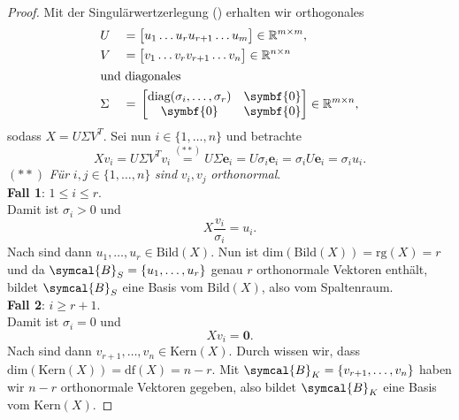 \begin{proof}
    Mit der Singulärwertzerlegung () erhalten wir orthogonales
    \begin{alignat*}{2}
        &U &{}={}&
        \big[
        \begin{matrix}
            u_1 \dots u_{r}u_{r+1} \dots u_m
        \end{matrix}
        \big]
        \in \R^{m \times m}, \\
        &V &{}={}&
        \big[
        \begin{matrix}
            v_1 \dots v_{r}v_{r+1} \dots v_n
        \end{matrix}
        \big]
        \in \R^{n \times n} \\
        \intertext{und diagonales} 
        &\Sigma &{}={}&
        \begin{bmatrix}
            \text{diag}(\sigma_i,\ldots,\sigma_r) & \symbf{0} \\
            \symbf{0} & \symbf{0}
        \end{bmatrix}
        \in \R^{m \times n},
    \end{alignat*} 
    sodass
    \(
        X = U \Sigma V^{T}
    \).
    Sei nun \(i \in \{1,\ldots,n\}\) und betrachte 
    \begin{equation*}
        Xv_i = U \Sigma V^{T}v_i \overset{(**)}{=} U \Sigma \symbf{e}_i = U \sigma_i \symbf{e}_i = \sigma_i U \symbf{e}_i = \sigma_i u_i.
    \end{equation*}
    {\small\((**)\) \textit{Für} \(i, j \in \{1,\ldots,n\}\) \textit{sind} \(v_i, v_j\) \textit{orthonormal}.} 
    \vspace{5pt}
    \\
    \textbf{Fall 1}: \(1 \leq i \leq r\). \\
    Damit ist \(\sigma_i > 0\) und
    \begin{equation*}
        X \frac{v_i}{\sigma_i} = u_i.
    \end{equation*} 
    Nach  sind dann \(u_1,\ldots,u_r \in \text{Bild}(X)\).
    Nun ist \(\text{dim}(\text{Bild}(X)) = \text{rg}(X) = r\) und da \(\symcal{B}_S = \{u_1,\ldots,u_r\}\) genau \(r\) orthonormale Vektoren enthält, bildet \(\symcal{B}_S\) eine Basis vom \(\text{Bild}(X)\), also vom Spaltenraum. 
    \vspace{5pt} \\
    \textbf{Fall 2}: \(i \geq r+1\). \\
    Damit ist \(\sigma_i = 0\) und
    \begin{equation*}
        Xv_i = \symbf{0}.
    \end{equation*}  
    Nach  sind dann \(v_{r+1},\ldots,v_n \in \text{Kern}(X)\).
    Durch  wissen wir, dass \(\text{dim}(\text{Kern}(X)) = \text{df}(X) = n - r\). 
    Mit \(\symcal{B}_K = \{v_{r+1},\ldots,v_n\}\) haben wir \(n-r\) orthonormale Vektoren gegeben, also bildet \(\symcal{B}_K\) eine Basis vom \(\text{Kern}(X)\).
    

\end{proof}
